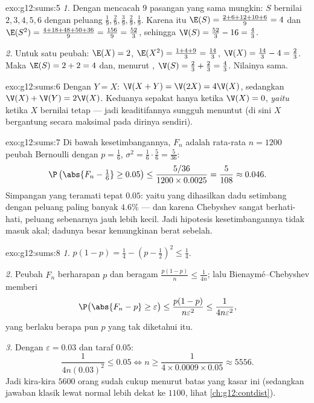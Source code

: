 \begin{solution}{exo:g12:sums:5}
\emph{1.} Dengan mencacah $9$ pasangan yang sama mungkin: $S$ bernilai
$2, 3, 4, 5, 6$ dengan peluang
$\frac19, \frac29, \frac39, \frac29, \frac19$. Karena itu
$\E(S) = \frac{2 + 6 + 12 + 10 + 6}{9} = 4$ dan
$\E(S^2) = \frac{4 + 18 + 48 + 50 + 36}{9} = \frac{156}{9} = \frac{52}{3}$,
sehingga $\V(S) = \frac{52}{3} - 16 = \frac43$.

\emph{2.} Untuk satu peubah: $\E(X) = 2$,
$\E(X^2) = \frac{1 + 4 + 9}{3} = \frac{14}{3}$,
$\V(X) = \frac{14}{3} - 4 = \frac23$. Maka $\E(S) = 2 + 2 = 4$ dan, menurut
, $\V(S) = \frac23 + \frac23 = \frac43$. Nilainya sama.
\end{solution}

\begin{solution}{exo:g12:sums:6}
Dengan $Y = X$: $\V(X + Y) = \V(2X) = 4\V(X)$, sedangkan
$\V(X) + \V(Y) = 2\V(X)$. Keduanya sepakat hanya ketika $\V(X) = 0$, \emph{yaitu}
ketika $X$ bernilai tetap --- jadi keaditifannya sungguh menuntut 
(di sini $X$ bergantung secara maksimal pada dirinya sendiri).
\end{solution}

\begin{solution}{exo:g12:sums:7}
Di bawah kesetimbangannya, $F_n$ adalah rata-rata $n = 1200$ peubah Bernoulli dengan
$p = \frac16$, $\sigma^2 = \frac16\cdot\frac56 = \frac{5}{36}$:
\[
\P\left(\abs{F_n - \tfrac16} \geq 0.05\right)
\leq \frac{5/36}{1200 \times 0.0025} = \frac{5}{108} \approx 0.046 .
\]
Simpangan yang teramati tepat $0.05$: yaitu  yang dihasilkan dadu setimbang
dengan peluang paling banyak $4.6\%$ --- dan karena Chebyshev sangat
berhati-hati, peluang sebenarnya jauh lebih kecil. Jadi hipotesis kesetimbangannya
tidak masuk akal; dadunya besar kemungkinan berat sebelah.
\end{solution}

\begin{solution}{exo:g12:sums:8}
\emph{1.} $p(1-p) = \frac14 - \left(p - \frac12\right)^2 \leq \frac14$.

\emph{2.} Peubah $F_n$ berharapan $p$ dan beragam
$\frac{p(1-p)}{n} \leq \frac{1}{4n}$; lalu Bienaymé--Chebyshev memberi
\[
\P\bigl(\abs{F_n - p} \geq \varepsilon\bigr)
\leq \frac{p(1-p)}{n\varepsilon^2} \leq \frac{1}{4n\varepsilon^2},
\]
yang berlaku berapa pun $p$ yang tak diketahui itu.

\emph{3.} Dengan $\varepsilon = 0.03$ dan taraf $0.05$:
\[
\frac{1}{4n(0.03)^2} \leq 0.05
\iff n \geq \frac{1}{4 \times 0.0009 \times 0.05} \approx 5556 .
\]
Jadi kira-kira $5600$ orang sudah cukup menurut batas yang kasar ini (sedangkan jawaban
klasik lewat  normal lebih dekat ke $1100$, lihat
\cref{ch:g12:contdist}).
\end{solution}

